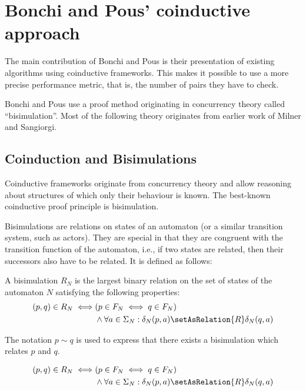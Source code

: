 \section{Bonchi and Pous' coinductive approach}

The main contribution of Bonchi and Pous is their presentation of existing
algorithms using coinductive frameworks. This makes it possible to use a more
precise performance metric, that is, the number of pairs they have to check.

Bonchi and Pous use a proof method originating in concurrency theory called
``bisimulation''. Most of the following theory originates from earlier work of
Milner\cite{milner1989communication} and Sangiorgi\cite{sangiorgi1998bisimulation}.

\subsection{Coinduction and Bisimulations}

Coinductive frameworks originate from concurrency theory and allow reasoning
about structures of which only their behaviour is known. The best-known
coinductive proof principle is bisimulation.

Bisimulations are relations on states of an automaton (or a similar transition
system, such as actors). They are special in that they are
congruent with the transition function of the automaton, i.e., if two states are
related, then their successors also have to be related.
It is defined as follows:

\begin{definition}
  A bisimulation $R_N$ is the largest binary relation on the set of states of
  the automaton $N$ satisfying the following properties:
  \begin{align*}
    (p, q) \in R_N \iff &(p \in F_N \iff q \in F_N)\\
      &\land \forall a \in \Sigma_N: \delta_N(p, a) \setAsRelation{R} \delta_N(q, a)
  \end{align*}

  The notation $p \sim q$ is used to express that there exists a bisimulation
  which relates {$p$ and $q$}.
\end{definition}

\begin{definition}
  \begin{align*}
    (p, q) \in R_N \iff &(p \in F_N \iff q \in F_N)\\
      &\land \forall a \in \Sigma_N: \delta_N(p, a) \setAsRelation{R} \delta_N(q, a)
  \end{align*}
\end{definition}

